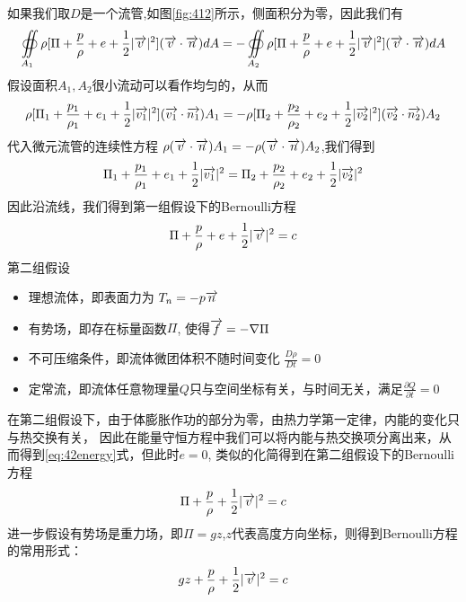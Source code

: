 如果我们取$D$是一个流管,如图\ref{fig:412}所示，侧面积分为零，因此我们有
\begin{equation}
\oiint\limits_{A_1} \rho[\Pi + \frac{p}{\rho} + e + \frac{1}{2} |\overrightarrow{v}|^2](\overrightarrow{v}\cdot \overrightarrow{n})dA=
-\oiint\limits_{A_2} \rho[\Pi + \frac{p}{\rho} + e + \frac{1}{2} |\overrightarrow{v}|^2](\overrightarrow{v}\cdot \overrightarrow{n})dA
\end{equation}
假设面积$A_1,A_2$很小流动可以看作均匀的，从而
\begin{equation}
\rho[\Pi_1 + \frac{p_1}{\rho_1} + e_1 + \frac{1}{2} |\overrightarrow{v_1}|^2](\overrightarrow{v_1}\cdot \overrightarrow{n_1})A_1=
-\rho[\Pi_2 + \frac{p_2}{\rho_2} + e_2 + \frac{1}{2} |\overrightarrow{v_2}|^2](\overrightarrow{v_2}\cdot \overrightarrow{n_2})A_2
\end{equation}
代入微元流管的连续性方程
$\rho(\overrightarrow{v}\cdot \overrightarrow{n})A_1=-\rho(\overrightarrow{v}\cdot \overrightarrow{n})A_2$,我们得到
\begin{equation}
\Pi_1 + \frac{p_1}{\rho_1} + e_1 + \frac{1}{2} |\overrightarrow{v_1}|^2 = \Pi_2 + \frac{p_2}{\rho_2} + e_2 + \frac{1}{2} |\overrightarrow{v_2}|^2
\end{equation}
因此沿流线，我们得到第一组假设下的Bernoulli方程
\begin{equation}
\Pi + \frac{p}{\rho} + e + \frac{1}{2} |\overrightarrow{v}|^2=c
\end{equation}
第二组假设
\begin{itemize}
\item 理想流体，即表面力为 $T_n=-p \overrightarrow{n}$
\item 有势场，即存在标量函数$\Pi$, 使得$\overrightarrow{f}=-\nabla \Pi$
\item 不可压缩条件，即流体微团体积不随时间变化 $\frac{D \rho}{D t}=0$
\item 定常流，即流体任意物理量$Q$只与空间坐标有关，与时间无关，满足$\frac{\partial Q}{\partial t}=0$
\end{itemize}
在第二组假设下，由于体膨胀作功的部分为零，由热力学第一定律，内能的变化只与热交换有关，
因此在能量守恒方程中我们可以将内能与热交换项分离出来，从而得到\eqref{eq:42energy}式，但此时$e=0$,
类似的化简得到在第二组假设下的Bernoulli方程
\begin{equation}
\Pi + \frac{p}{\rho} + \frac{1}{2} |\overrightarrow{v}|^2 = c
\end{equation}
进一步假设有势场是重力场，即$\Pi=gz$,$z$代表高度方向坐标，则得到Bernoulli方程的常用形式：
\begin{equation}
gz + \frac{p}{\rho} + \frac{1}{2} |\overrightarrow{v}|^2 = c
\end{equation}

\begin{equation}
\end{equation}
